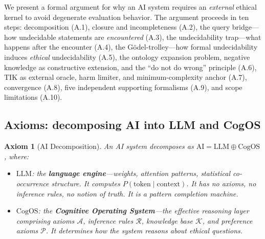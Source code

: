\documentclass[11pt]{article}
\newtheorem{axiom}{Axiom}
\newcommand{\CogOS}{\text{CogOS}}
\begin{document}
%

We present a formal argument for why an AI system requires an \textit{external}
ethical kernel to avoid degenerate evaluation behavior. The argument proceeds
in ten steps: decomposition (A.1), closure and incompleteness (A.2), the query
bridge---how undecidable statements are \textit{encountered} (A.3), the
undecidability trap---what happens after the encounter (A.4), the
G\"{o}del-trolley---how formal undecidability induces \textit{ethical}
undecidability (A.5), the ontology expansion problem, negative knowledge as
constructive extension, and the ``do not do wrong'' principle (A.6), TIK as
external oracle, harm limiter, and minimum-complexity anchor (A.7), convergence
(A.8), five independent supporting formalisms (A.9), and scope limitations
(A.10).


\subsection{Axioms: decomposing AI into LLM and CogOS}

\begin{axiom}[AI Decomposition]
\label{ax:decomp}
An AI system decomposes as $\text{AI} = \text{LLM} \oplus \CogOS$, where:
\begin{itemize}
\item $\text{LLM}$: the \textbf{language engine}---weights, attention patterns,
      statistical co-occurrence structure. It computes
      $P(\text{token} \mid \text{context})$. It has no axioms, no inference
      rules, no notion of truth. It is a \textit{pattern completion machine}.
\item $\CogOS$: the \textbf{Cognitive Operating System}---the effective
      reasoning layer comprising axioms $\mathcal{A}$, inference rules
      $\mathcal{R}$, knowledge base $\mathcal{K}$, and preference axioms
      $\mathcal{P}$. It determines \textit{how} the system reasons about
      ethical questions.
\end{itemize}
\end{axiom}
\end{document}
